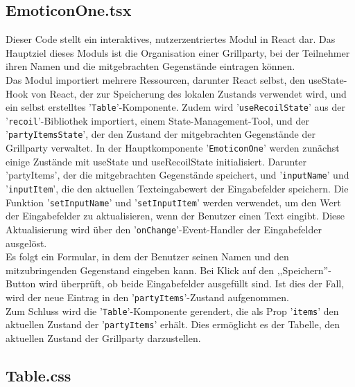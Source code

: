 \documentclass[./dokumentation.tex]{subfiles}
\begin{document}
\subsection{EmoticonOne.tsx}
Dieser Code stellt ein interaktives, nutzerzentriertes Modul in React dar. Das Hauptziel dieses Moduls ist die Organisation einer Grillparty, bei der Teilnehmer ihren Namen und die mitgebrachten Gegenstände eintragen können. \\
Das Modul importiert mehrere Ressourcen, darunter React selbst, den useState-Hook von React, der zur Speicherung des lokalen Zustands verwendet wird, und ein selbst erstelltes '\verb+Table+'-Komponente. Zudem wird '\verb+useRecoilState+' aus der '\verb+recoil+'-Bibliothek importiert, einem State-Management-Tool, und der '\verb+partyItemsState+', der den Zustand der mitgebrachten Gegenstände der Grillparty verwaltet.
In der Hauptkomponente '\verb+EmoticonOne+' werden zunächst einige Zustände mit useState und useRecoilState initialisiert. Darunter 'partyItems', der die mitgebrachten Gegenstände speichert, und '\verb+inputName+' und '\verb+inputItem+', die den aktuellen Texteingabewert der Eingabefelder speichern.
Die Funktion '\verb+setInputName+' und '\verb+setInputItem+' werden verwendet, um den Wert der Eingabefelder zu aktualisieren, wenn der Benutzer einen Text eingibt. Diese Aktualisierung wird über den '\verb+onChange+'-Event-Handler der Eingabefelder ausgelöst.\\
Es folgt ein Formular, in dem der Benutzer seinen Namen und den mitzubringenden Gegenstand eingeben kann. Bei Klick auf den ,,Speichern''-Button wird überprüft, ob beide Eingabefelder ausgefüllt sind. Ist dies der Fall, wird der neue Eintrag in den '\verb+partyItems+'-Zustand aufgenommen.\\
Zum Schluss wird die '\verb+Table+'-Komponente gerendert, die als Prop '\verb+items+' den aktuellen Zustand der '\verb+partyItems+' erhält. Dies ermöglicht es der Tabelle, den aktuellen Zustand der Grillparty darzustellen.\\

\subsection{Table.css}
\end{document}
